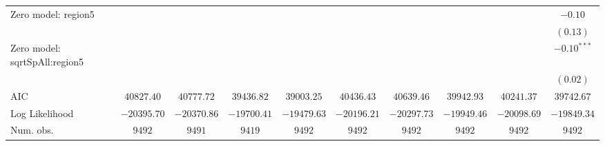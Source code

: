 \begin{center}
\begin{longtable}{l c c c c c c c c c}
Zero model: region5            &                &                &               &               &               &                 &               &               & $-0.10$         \\
                               &                &                &               &               &               &                 &               &               & $(0.13)$        \\
Zero model: sqrtSpAll:region5  &                &                &               &               &               &                 &               &               & $-0.10^{***}$   \\
                               &                &                &               &               &               &                 &               &               & $(0.02)$        \\
\midrule
AIC                            & $40827.40$     & $40777.72$     & $39436.82$    & $39003.25$    & $40436.43$    & $40639.46$      & $39942.93$    & $40241.37$    & $39742.67$      \\
Log Likelihood                 & $-20395.70$    & $-20370.86$    & $-19700.41$   & $-19479.63$   & $-20196.21$   & $-20297.73$     & $-19949.46$   & $-20098.69$   & $-19849.34$     \\
Num. obs.                      & $9492$         & $9491$         & $9419$        & $9492$        & $9492$        & $9492$          & $9492$        & $9492$        & $9492$          \\
\end{longtable}
\end{center}
